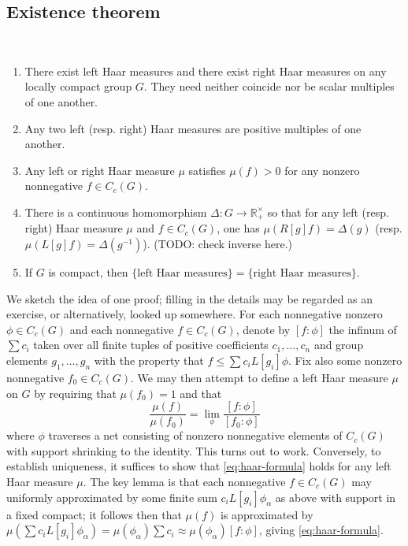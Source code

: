 \documentclass[reqno]{amsart} 
\begin{document}
\subsection{Existence theorem}
\label{sec:orga3b0a45}
\begin{theorem}\label{thm:basics-on-haar-measure}
~
  \begin{enumerate}
  \item   There exist left Haar measures and there exist right Haar measures on any locally
  compact group $G$.  They need neither coincide nor be scalar multiples of one another.
\item   Any two left (resp. right) Haar measures are positive
  multiples
  of one another.
\item   Any left or right Haar measure
  $\mu$ satisfies
  $\mu(f) > 0$ for any nonzero nonnegative $f \in C_c(G)$.
\item
  There is a continuous homomorphism $\Delta : G \rightarrow
  \mathbb{R}_+^\times$
  so that for any left (resp. right) Haar measure $\mu$
  and $f \in C_c(G)$,
  one has
  $\mu(R[g] f) = \Delta(g)$
  (resp.   $\mu(L[g] f) = \Delta(g^{-1})$).
  (TODO: check inverse here.)
\item   If $G$ is compact, then
  $\{\text{left Haar measures}\}
  = \{\text{right Haar measures}\}$.
  \end{enumerate}
\end{theorem}
We sketch the idea of one proof; filling in the details may be regarded as an exercise, or alternatively, looked up somewhere.  For each
nonnegative nonzero $\phi \in C_c(G)$ and each nonnegative
$f \in C_c(G)$, denote by $[f:\phi]$ the infinum of $\sum c_i$
taken over all finite tuples of positive coefficients
$c_1,\dotsc,c_n$ and group elements $g_1,\dotsc,g_n$ with the
property that $f \leq \sum c_i L[g_i] \phi$.  Fix also some
nonzero nonnegative $f_0 \in C_c(G)$.
We may then attempt to define a left Haar measure
$\mu$ on $G$ by requiring that  $\mu(f_0) = 1$
and that
\begin{equation}\label{eq:haar-formula}
  \frac{\mu(f)}{\mu(f_0)}
  =
  \lim_{\phi}
  \frac{[f:\phi]}{[f_0:\phi]}
\end{equation}
where $\phi$ traverses a net
consisting of nonzero nonnegative elements of $C_c(G)$
with support shrinking to the identity.
This turns out to work.
Conversely,
to establish uniqueness,
it suffices to show that \eqref{eq:haar-formula}
holds for any left Haar measure $\mu$.
The key lemma is that each nonnegative $f \in C_c(G)$
may uniformly approximated
by some finite sum $c_i L[g_i] \phi_\alpha$
as above
with support in a fixed compact;
it follows then that
$\mu(f)$ is approximated by $\mu(\sum c_i L[g_i] \phi_\alpha) =
\mu(\phi_\alpha) \sum c_i \approx \mu(\phi_\alpha) [f:\phi]$,
giving \eqref{eq:haar-formula}.
\end{document}
